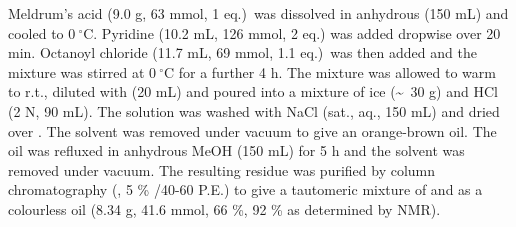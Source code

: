 Meldrum's acid (9.0 g, 63 mmol, 1 eq.)\ was dissolved in anhydrous  (150 mL) and cooled to $0\ ^{\circ}$C. Pyridine (10.2 mL, 126 mmol, 2 eq.) was added dropwise over 20 min. Octanoyl chloride (11.7 mL, 69 mmol, 1.1 eq.)\ was then added and the mixture was stirred at $0\ ^{\circ}$C for a further 4 h. 
The mixture was allowed to warm to r.t., diluted with  (20 mL) and poured into a mixture of ice (\textasciitilde ~30 g) and HCl (2 N, 90 mL). The solution was washed with NaCl (sat., aq., 150 mL) and dried over . The solvent was removed under vacuum to give an orange-brown oil.
The oil was refluxed in anhydrous MeOH (150 mL) for 5 h and the solvent was removed under vacuum. The resulting residue was purified by column chromatography (, 5 \% /40-60 P.E.) to give a tautomeric mixture of  and  as a colourless oil (8.34 g, 41.6 mmol, 66 \%, 92 \% 
 as determined by NMR).
\\[1\baselineskip]
